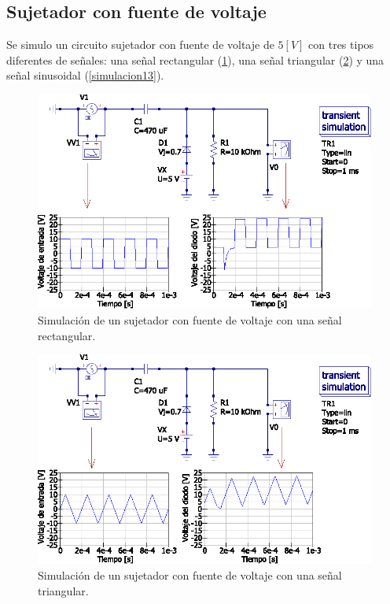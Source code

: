 \documentclass[letter,twoside,11pt]{article}
\begin{document}
{\subsection{Sujetador con fuente de voltaje}
Se simulo un circuito sujetador con fuente de voltaje de $5[V]$  con tres tipos
diferentes de señales: una señal rectangular (\ref{simulacion11}), una señal
triangular (\ref{simulacion12}) y una señal sinusoidal (\ref{simulacion13}).

\begin{figure}[!h]
\centering
\includegraphics[scale=1.00]{simulacion/practica1.11.eps}
\caption{Simulación de un sujetador con fuente de voltaje con una señal rectangular.}
\label{simulacion11}
\end{figure}

\begin{figure}[!h]
\centering
\includegraphics[scale=1.00]{simulacion/practica1.12.eps}
\caption{Simulación de un sujetador con fuente de voltaje con una señal triangular.}
\label{simulacion12}
\end{figure}

}
\end{document}
